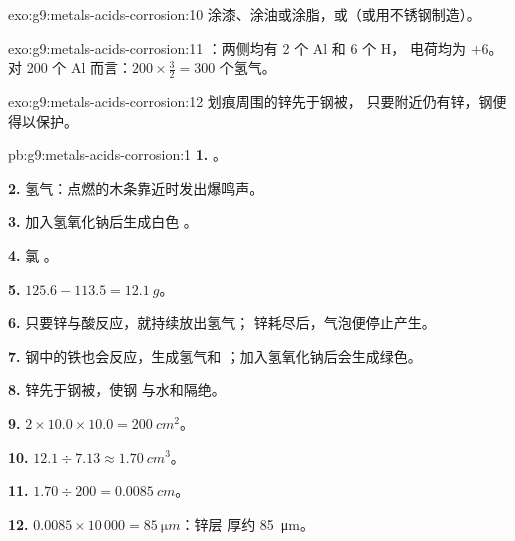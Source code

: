 \begin{solution}{exo:g9:metals-acids-corrosion:10}
涂漆、涂油或涂脂，或（或用不锈钢制造）。
\end{solution}

\begin{solution}{exo:g9:metals-acids-corrosion:11}
：两侧均有 2 个 Al 和 6 个 H，
电荷均为 $+6$。对 200 个 Al 而言：$200 \times \frac{3}{2} = 300$
个氢气。
\end{solution}

\begin{solution}{exo:g9:metals-acids-corrosion:12}
划痕周围的锌先于钢被，
只要附近仍有锌，钢便得以保护。
\end{solution}

\begin{solution}{pb:g9:metals-acids-corrosion:1}
\textbf{1.} 。

\textbf{2.} 氢气：点燃的木条靠近时发出爆鸣声。

\textbf{3.} 加入氢氧化钠后生成白色
。

\textbf{4.} 氯 。

\textbf{5.} $125.6 - 113.5 = \qty{12.1}{g}$。

\textbf{6.} 只要锌与酸反应，就持续放出氢气；
锌耗尽后，气泡便停止产生。

\textbf{7.} 钢中的铁也会反应，生成氢气和
 ；加入氢氧化钠后会生成绿色。

\textbf{8.} 锌先于钢被，使钢
与水和隔绝。

\textbf{9.} $2 \times 10.0 \times 10.0 = \qty{200}{cm^2}$。

\textbf{10.} $12.1 \div 7.13 \approx \qty{1.70}{cm^3}$。

\textbf{11.} $1.70 \div 200 = \qty{0.0085}{cm}$。

\textbf{12.} $0.0085 \times 10\,000 = \qty{85}{\micro m}$：锌层
厚约 \qty{85}{\micro m}。
\end{solution}
